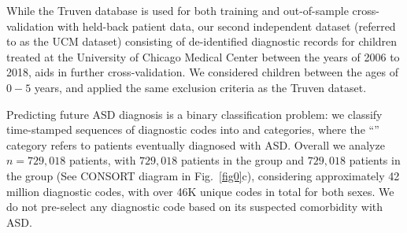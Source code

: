 \documentclass[onecolumn, compsoc,11pt]{IEEEtran}
\renewcommand{\captionN}[1]{\caption{\color{CadetBlue4!80!black} \sffamily \fontsize{9}{10}\selectfont #1  }}
\def\totalpatients{729,018} %
\def\totalnpos{729,018} %
\def\totalnneg{729,018} %
\begin{document}



While the Truven database is used for both training and out-of-sample cross-validation with held-back patient data, our second independent dataset (referred to as the UCM dataset) consisting of de-identified diagnostic records for children treated at the University of Chicago Medical Center between the years of 2006 to 2018, aids in further cross-validation. We considered children between the ages of $0-5$ years, and  applied the same exclusion criteria as the Truven dataset.

Predicting  future ASD diagnosis   is a  binary classification problem: we classify time-stamped sequences of diagnostic codes  into \treatment and \control categories, where the ``\treatment'' category refers to patients eventually  diagnosed with ASD. Overall we analyze $n=\totalpatients$ patients, with $\totalnpos$ patients in the \treatment group and $\totalnneg$ patients in the \control group (See CONSORT diagram in Fig.~\ref{fig0}c), considering approximately  42 million diagnostic codes, with over 46K unique codes in total for both sexes. We do not pre-select any diagnostic   code based on its  suspected comorbidity with ASD. 
\end{document}
